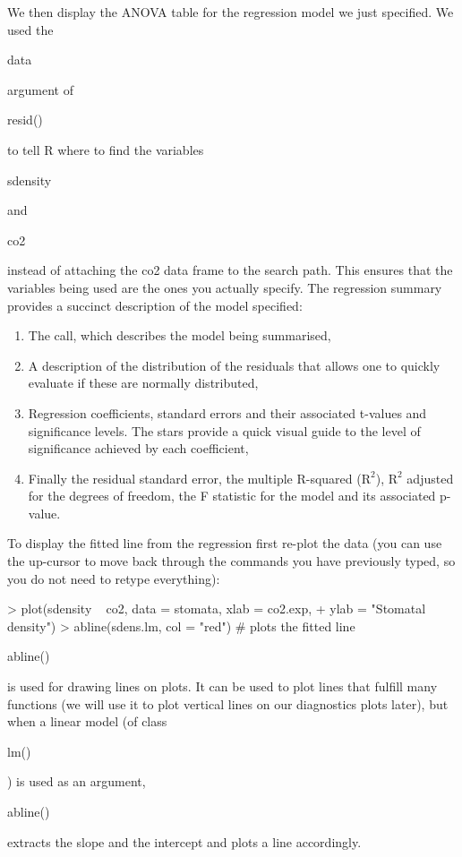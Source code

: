\documentclass[letterpaper,10pt]{article}
\newenvironment{rline}{\begin{small}\begin{ttfamily}}{\end{ttfamily}\end{small}}
\begin{document}
We then display the ANOVA table for the regression model we just specified. We used the \begin{rline}data\end{rline} argument of \begin{rline}resid()\end{rline} to tell R where to find the variables \begin{rline}sdensity\end{rline} and \begin{rline}co2\end{rline} instead of attaching the co2 data frame to the search path. This ensures that the variables being used are the ones you actually specify. The regression summary provides a succinct description of the model specified:
\begin{enumerate}
    \item The call, which describes the model being summarised,
	\item A description of the distribution of the residuals that allows one to quickly evaluate if these are normally distributed,
    \item Regression coefficients, standard errors and their associated t-values and significance levels. The stars provide a quick visual guide to the level of significance achieved by each coefficient,
    \item Finally the residual standard error, the multiple R-squared ($\mathrm{R}^2$), $\mathrm{R}^2$ adjusted for the degrees of freedom, the F statistic for the model and its associated p-value.
\end{enumerate}
To display the fitted line from the regression first re-plot the data (you can use the up-cursor to move back through the commands you have previously typed, so you do not need to retype everything):

\begin{Schunk}
\begin{Sinput}
> plot(sdensity ~ co2, data = stomata, xlab = co2.exp,
+      ylab = "Stomatal density")
> abline(sdens.lm, col = "red")           # plots the fitted line
\end{Sinput}
\end{Schunk}

\begin{rline}abline()\end{rline} is used for drawing lines on plots. It can be used to plot lines that fulfill many functions (we will use it to plot vertical lines on our diagnostics plots later), but when a linear model (of class \begin{rline}lm()\end{rline}) is used as an argument, \begin{rline}abline()\end{rline} extracts the slope and the intercept and plots a line accordingly.
\end{document}
